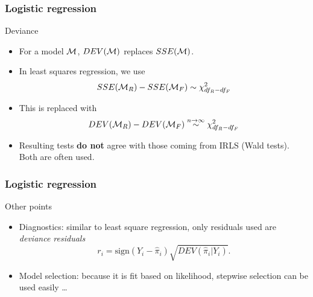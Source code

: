 \documentclass[handout]{beamer}
\begin{document}
   \begin{frame} \frametitle{Logistic regression}

   \begin{block}
         {Deviance}
         \begin{itemize}
         \item For a model ${\cal M}$, $DEV({\cal M})$ replaces $SSE({\cal M})$.


   \item In least squares regression, we use
   $$
   SSE({\cal M}_R) - SSE({\cal M}_F) \sim \chi^2_{df_R-df_F}$$

   \item This is replaced with
   $$
   DEV({\cal M}_R) - DEV({\cal M}_F) \overset{n \rightarrow \infty}{\sim} \chi^2_{df_R-df_F}$$

   \item Resulting tests {\bf do not} agree with those coming from IRLS (Wald tests). Both are often used.
         \end{itemize}
   \end{block}
   \end{frame}


   \begin{frame} \frametitle{Logistic regression}

   \begin{block}
         {Other points}
         \begin{itemize}
         \item Diagnostics: similar to least square regression, only residuals
   used are {\em deviance residuals}
   $$
   r_i = \text{sign}(Y_i-\widehat{\pi}_i) \sqrt{DEV(\widehat{\pi}_i|Y_i)}.
   $$

   \item Model selection: because it is fit based on likelihood,
   stepwise selection can be used easily \dots
         \end{itemize}
   \end{block}
   \end{frame}

\end{document}
